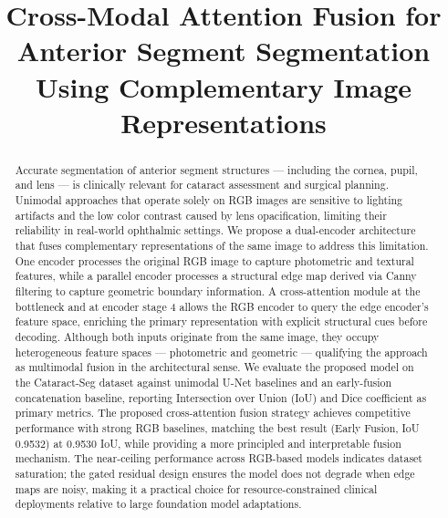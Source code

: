 \documentclass[conference]{IEEEtran}
\begin{document}
\title{Cross-Modal Attention Fusion for Anterior Segment Segmentation Using Complementary Image Representations}

\author{
    \and
    \and
}

\maketitle

\begin{abstract}
Accurate segmentation of anterior segment structures — including the cornea, pupil, and lens — is clinically relevant for cataract assessment and surgical planning. Unimodal approaches that operate solely on RGB images are sensitive to lighting artifacts and the low color contrast caused by lens opacification, limiting their reliability in real-world ophthalmic settings. We propose a dual-encoder architecture that fuses complementary representations of the same image to address this limitation. One encoder processes the original RGB image to capture photometric and textural features, while a parallel encoder processes a structural edge map derived via Canny filtering to capture geometric boundary information. A cross-attention module at the bottleneck and at encoder stage 4 allows the RGB encoder to query the edge encoder's feature space, enriching the primary representation with explicit structural cues before decoding. Although both inputs originate from the same image, they occupy heterogeneous feature spaces — photometric and geometric — qualifying the approach as multimodal fusion in the architectural sense. We evaluate the proposed model on the Cataract-Seg dataset against unimodal U-Net baselines and an early-fusion concatenation baseline, reporting Intersection over Union (IoU) and Dice coefficient as primary metrics. The proposed cross-attention fusion strategy achieves competitive performance with strong RGB baselines, matching the best result (Early Fusion, IoU 0.9532) at 0.9530 IoU, while providing a more principled and interpretable fusion mechanism. The near-ceiling performance across RGB-based models indicates dataset saturation; the gated residual design ensures the model does not degrade when edge maps are noisy, making it a practical choice for resource-constrained clinical deployments relative to large foundation model adaptations.
\end{abstract}
\end{document}

